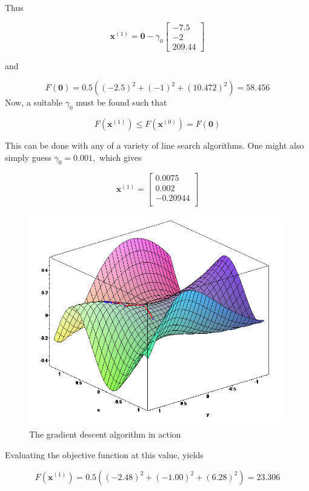 \documentclass[11pt]{article}
\begin{document}
Thus

    \[ \mathbf {x} ^{(1)}=\mathbf {0} -\gamma _{0}{\begin{bmatrix}-7.5\\-2\\209.44\end{bmatrix}}\]

and

    \[ F(\mathbf {0} )=0.5\left((-2.5)^{2}+(-1)^{2}+(10.472)^{2}\right)=58.456\]
Now, a suitable \(\gamma _{0}\) must be found such that

    \[ F\left(\mathbf {x} ^{(1)}\right)\leq F\left(\mathbf {x} ^{(0)}\right)=F(\mathbf {0} )\]

This can be done with any of a variety of line search algorithms. One might also simply guess \( \gamma _{0}=0.001,\) which gives

    \[ \mathbf {x} ^{(1)}={\begin{bmatrix}0.0075\\0.002\\-0.20944\\\end{bmatrix}}\]

\begin{figure}
\includegraphics[width=0.9\linewidth]{photo/3.png} 
\caption{The gradient descent algorithm in action}
\label{fig:wrapfig2}
\end{figure}
Evaluating the objective function at this value, yields

    \[ F\left(\mathbf {x} ^{(1)}\right)=0.5\left((-2.48)^{2}+(-1.00)^{2}+(6.28)^{2}\right)=23.306\]
\end{document}
